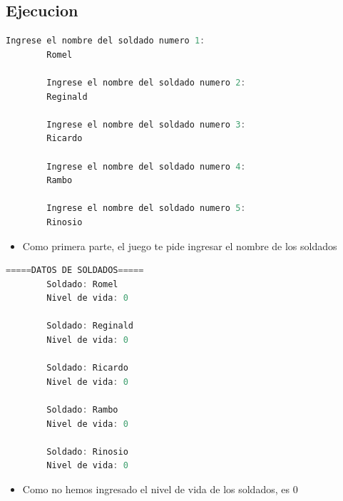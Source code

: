 \documentclass{article}
\begin{document}
        \subsection{Ejecucion}
        \begin{lstlisting}[language=java, caption={Salida por consola}]
        Ingrese el nombre del soldado numero 1:
        Romel
        
        Ingrese el nombre del soldado numero 2:
        Reginald
        
        Ingrese el nombre del soldado numero 3:
        Ricardo
        
        Ingrese el nombre del soldado numero 4:
        Rambo
        
        Ingrese el nombre del soldado numero 5:
        Rinosio

        \end{lstlisting}
        \begin{itemize}
            \item Como primera parte, el juego te pide ingresar el nombre de los soldados
        \end{itemize}
        \begin{lstlisting}[language=java, caption={Muestreo de datos al usuario}]
        =====DATOS DE SOLDADOS=====
        Soldado: Romel
        Nivel de vida: 0
        
        Soldado: Reginald
        Nivel de vida: 0
        
        Soldado: Ricardo
        Nivel de vida: 0
        
        Soldado: Rambo
        Nivel de vida: 0
        
        Soldado: Rinosio
        Nivel de vida: 0
        \end{lstlisting}
        \begin{itemize}
            \item Como no hemos ingresado el nivel de vida de los soldados, es 0
        \end{itemize}
\end{document}
